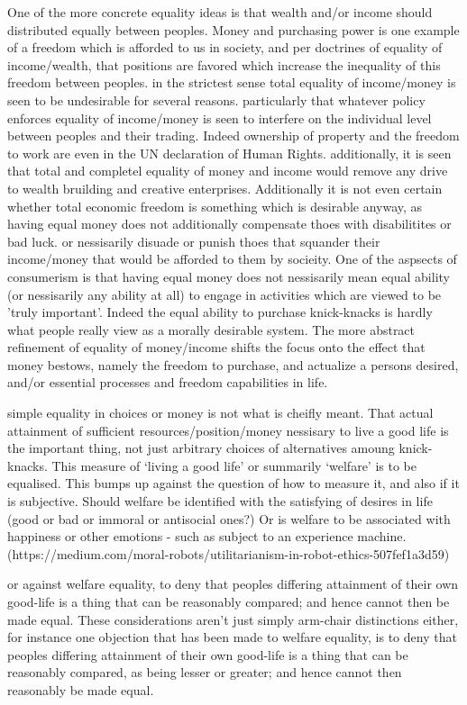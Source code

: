 \documentclass{article}
\begin{document}
One of the more concrete equality ideas is that wealth and/or income should distributed equally between peoples.
Money and purchasing power is one example of a freedom which is afforded to us in society, and per doctrines of equality of income/wealth, that positions are favored which increase the inequality of this freedom between peoples.
in the strictest sense total equality of income/money is seen to be undesirable for several reasons.
particularly that whatever policy enforces equality of income/money is seen to interfere on the individual level between peoples and their trading.
Indeed ownership of property and the freedom to work are even in the UN declaration of Human Rights. additionally, it is seen that total and completel equality of money and income would remove any drive to wealth bruilding and creative enterprises.
Additionally it is not even certain whether total economic freedom is something which is desirable anyway, as having equal money does not additionally compensate thoes with disabilitites or bad luck.
or nessisarily disuade or punish thoes that squander their income/money that would be afforded to them by socieity.
One of the aspsects of consumerism is that having equal money does not nessisarily mean equal ability (or nessisarily any ability at all) to engage in activities which are viewed to be 'truly important'.
Indeed the equal ability to purchase knick-knacks is hardly what people really view as a morally desirable system.
The more abstract refinement of equality of money/income shifts the focus onto the effect that money bestows, namely the freedom to purchase, and actualize a persons desired, and/or essential processes and freedom capabilities in life.


simple equality in choices or money is not what is cheifly meant. That actual attainment of sufficient resources/position/money nessisary to live a good life is the important thing, not just arbitrary choices of alternatives amoung knick-knacks.
This measure of `living a good life' or summarily `welfare' is to be equalised.
This bumps up against the question of how to measure it, and also if it is subjective.
Should welfare be identified with the satisfying of desires in life (good or bad or immoral or antisocial ones?)
Or is welfare to be associated with happiness or other emotions - such as subject to an experience machine.\cite{nozick2013anarchy}
(https://medium.com/moral-robots/utilitarianism-in-robot-ethics-507fef1a3d59)

or against welfare equality, to deny that peoples differing attainment of their own good-life is a thing that can be reasonably compared; and hence cannot then be made equal.
These considerations aren't just simply arm-chair distinctions either, for instance one objection that has been made to welfare equality, is to deny that peoples differing attainment of their own good-life is a thing that can be reasonably compared, as being lesser or greater; and hence cannot then reasonably be made equal.
\end{document}
